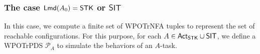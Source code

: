 \documentclass[preprint,12pt]{elsarticle}
\newcommand\Mm{{\mathcal{M} }}
\newcommand\Pp{{\mathcal{P} }}
\newcommand\act{{\sf Act}}
\newcommand\lmd{{\sf Lmd}}
\newcommand\singletask{{\sf STK}}
\newcommand\singleinstance{{\sf SIT}}
\newcommand\startactivity{{\mathsf{start} }}
\newcommand\post{{\mathsf{post} }}
\newcommand{\STK}{\mathsf{STK}}
\newcommand{\SIT}{\mathsf{SIT}}
\newcommand{\id}{\mathsf{id}}
\newcommand\Aut{{\mathfrak{A} }}
\newcommand\Lang{{\mathscr{L} }}
\newcommand{\WOTrPDS}{\textsf{WPOTrPDS}}
\newcommand{\WOTrNFA}{\textsf{WPOTrNFA}}
\newcommand\pop{\mathsf{pop}}
\begin{document}


\subsubsection{The case $\lmd(A_0) = \STK$ or $\SIT$}\label{sec:amass-stk}

In this case, we compute a finite set of {\WOTrNFA} tuples to represent the set of reachable configurations.
For this purpose, for each $A \in \act_\singletask \cup \singleinstance$, we define a {\WOTrPDS} $\Pp_A$ to simulate the behaviors of an $A$-task. 
\end{document}
